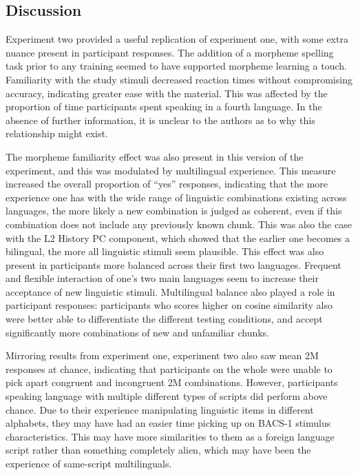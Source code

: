 \subsection{Discussion}
\label{Discussion2}
\setlength{\parindent}{20pt}
\justifying

\noindent
Experiment two provided a useful replication of experiment one, with some extra nuance present in participant responses. The addition of a morpheme spelling task prior to any training seemed to have supported morpheme learning a touch. Familiarity with the study stimuli decreased reaction times without compromising accuracy, indicating greater ease with the material. This was affected by the proportion of time participants spent speaking in a fourth language. In the absence of further information, it is unclear to the authors as to why this relationship might exist. 

The morpheme familiarity effect was also present in this version of the experiment, and this was modulated by multilingual experience. This measure increased the overall proportion of ``yes'' responses, indicating that the more experience one has with the wide range of linguistic combinations existing across languages, the more likely a new combination is judged as coherent, even if this combination does not include any previously known chunk. This was also the case with the L2 History PC component, which showed that the earlier one becomes a bilingual, the more all linguistic stimuli seem plausible. This effect was also present in participants more balanced across their first two languages. Frequent and flexible interaction of one's two main languages seem to increase their acceptance of new linguistic stimuli. Multilingual balance also played a role in participant responses: participants who scores higher on cosine similarity also were better able to differentiate the different testing conditions, and accept significantly more combinations of new and unfamiliar chunks.

Mirroring results from experiment one, experiment two also saw mean 2M responses at chance, indicating that participants on the whole were unable to pick apart congruent and incongruent 2M combinations. However, participants speaking language with multiple different types of scripts did perform above chance. Due to their experience manipulating linguistic items in different alphabets, they may have had an easier time picking up on BACS-1 stimulus characteristics. This may have more similarities to them as a foreign language script rather than something completely alien, which may have been the experience of same-script multilinguals.

